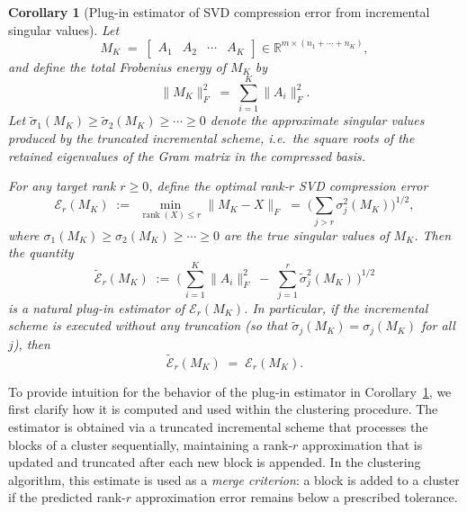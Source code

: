 \documentclass[10pt]{article} %
\newtheorem{corollary}{Corollary}
\begin{document}
\begin{corollary}[Plug-in estimator of SVD compression error from incremental singular values]
\label{cor:plugin-error}
Let
\[
  M_K \;=\;
  \begin{bmatrix}
    A_1 & A_2 & \cdots & A_K
  \end{bmatrix}
  \in\mathbb{R}^{m\times (n_1+\cdots+n_K)},
\]
and define the total Frobenius energy of $M_K$ by
\[
  \|M_K\|_F^2
  \;=\;
  \sum_{i=1}^K \|A_i\|_F^2.
\]
Let $\widetilde{\sigma}_1(M_K)\ge \widetilde{\sigma}_2(M_K)\ge\cdots\ge 0$
denote the approximate singular values produced by the truncated incremental
scheme, i.e.\ the square roots
of the retained eigenvalues of the Gram matrix in the compressed basis.

For any target rank $r\ge 0$, define the optimal rank-$r$ SVD compression
error
\[
  \mathcal{E}_r(M_K)
  \;:=\;
  \min_{\operatorname{rank}(X)\le r} \|M_K - X\|_F
  \;=\;
  \Bigg(\sum_{j>r} \sigma_j^2(M_K)\Bigg)^{1/2},
\]
where $\sigma_1(M_K)\ge\sigma_2(M_K)\ge\cdots\ge 0$ are the true singular
values of $M_K$.
Then the quantity
\[
  \widetilde{\mathcal{E}}_r(M_K)
  \;:=\;
  \Bigg(\,
    \sum_{i=1}^K \|A_i\|_F^2
    \;-\;
    \sum_{j=1}^r \widetilde{\sigma}_j^2(M_K)
  \,\Bigg)^{1/2}
\]
is a natural plug-in estimator of $\mathcal{E}_r(M_K)$.  
In particular, if the incremental scheme is executed without any truncation (so that
$\widetilde{\sigma}_j(M_K) = \sigma_j(M_K)$ for all $j$), then
\[
  \widetilde{\mathcal{E}}_r(M_K)
  \;=\;
  \mathcal{E}_r(M_K).
\]
\end{corollary}

To provide intuition for the behavior of the plug-in estimator in
Corollary~\ref{cor:plugin-error}, we first clarify how it is computed and used
within the clustering procedure. The estimator is obtained via a truncated
incremental scheme that processes the blocks of a cluster sequentially,
maintaining a rank-$r$ approximation that is updated and truncated after each
new block is appended. In the clustering algorithm, this estimate is used as a
\emph{merge criterion}: a block is added to a cluster if the predicted
rank-$r$ approximation error remains below a prescribed tolerance.
\end{document}
